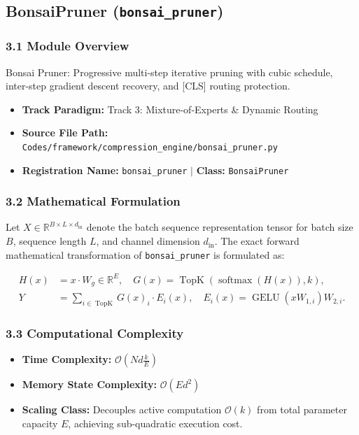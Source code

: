 \subsection{BonsaiPruner (\texttt{bonsai\_pruner})}
\label{sec:app_module_bonsai_pruner}

\subsubsection*{3.1 Module Overview}
Bonsai Pruner: Progressive multi-step iterative pruning with cubic schedule, inter-step gradient descent recovery, and [CLS] routing protection.
\begin{itemize}
    \item \textbf{Track Paradigm:} Track 3: Mixture-of-Experts & Dynamic Routing
    \item \textbf{Source File Path:} \texttt{Codes/framework/compression\_engine/bonsai\_pruner.py}
    \item \textbf{Registration Name:} \texttt{bonsai\_pruner} $\mid$ \textbf{Class:} \texttt{BonsaiPruner}
\end{itemize}

\subsubsection*{3.2 Mathematical Formulation}
Let $X \in \mathbb{R}^{B \times L \times d_{\text{in}}}$ denote the batch sequence representation tensor for batch size $B$, sequence length $L$, and channel dimension $d_{\text{in}}$. The exact forward mathematical transformation of \texttt{bonsai\_pruner} is formulated as:

\begin{align}
H(x) &= x \cdot W_g \in \mathbb{R}^{E}, \quad G(x) = \operatorname{TopK}\left(\operatorname{softmax}(H(x)), k\right), \\
Y &= \sum_{i \in \operatorname{TopK}} G(x)_i \cdot E_i(x), \quad E_i(x) = \operatorname{GELU}(x W_{1, i}) W_{2, i}.
\end{align}


\subsubsection*{3.3 Computational Complexity}
\begin{itemize}
    \item \textbf{Time Complexity:} $\mathcal{O}(N d \frac{k}{E})$
    \item \textbf{Memory State Complexity:} $\mathcal{O}(E d^2)$
    \item \textbf{Scaling Class:} Decouples active computation $\mathcal{O}(k)$ from total parameter capacity $E$, achieving sub-quadratic execution cost.
\end{itemize}

